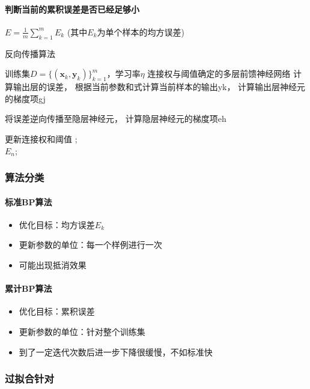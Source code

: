 \documentclass[UTF8]{ctexart}
\begin{document}
\paragraph{判断当前的累积误差是否已经足够小}
$E = \frac{1}{m}\sum_{k=1}^mE_k$ (其中$E_k$为单个样本的均方误差)

\begin{algorithm}[htb]  
	\caption{反向传播算法}  
	\begin{algorithmic}[1]  
	  \Require  
	  	$训练集D = \{(\pmb x_k, \pmb y_k)\}_{k=1}^m$，学习率$\eta$  
	  \Ensure  
	  	连接权与阈值确定的多层前馈神经网络
			\State 计算输出层的误差，
			根据当前参数和式计算当前样本的输出yk，
			计算输出层神经元的梯度项gj
  
			\State 将误差逆向传播至隐层神经元，
				计算隐层神经元的梯度项eh
		
			\State 更新连接权和阈值
		\EndFor;  
	\EndWhile  
	\\
	\Return $E_n$;  
	\end{algorithmic}  
\end{algorithm}  

\subsubsection{算法分类}
\paragraph{标准BP算法}
\begin{itemize}
	\item 优化目标：均方误差$E_k$
	\item 更新参数的单位：每一个样例进行一次
	\item 可能出现抵消效果
\end{itemize}
\paragraph{累计BP算法}
\begin{itemize}
	\item 优化目标：累积误差
	\item 更新参数的单位：针对整个训练集
	\item 到了一定迭代次数后进一步下降很缓慢，不如标准快
\end{itemize}

\subsubsection{过拟合针对}
\end{document}
